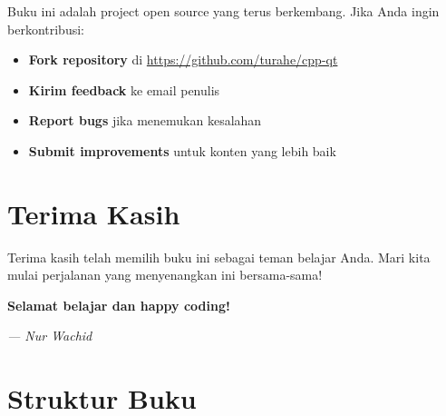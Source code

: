 Buku ini adalah project open source yang terus berkembang. Jika Anda ingin berkontribusi:

\begin{itemize}
\item \textbf{Fork repository} di \url{https://github.com/turahe/cpp-qt}
\item \textbf{Kirim feedback} ke email penulis
\item \textbf{Report bugs} jika menemukan kesalahan
\item \textbf{Submit improvements} untuk konten yang lebih baik
\end{itemize}

\section*{Terima Kasih}

Terima kasih telah memilih buku ini sebagai teman belajar Anda. Mari kita mulai perjalanan yang menyenangkan ini bersama-sama!

\begin{center}
\textbf{Selamat belajar dan happy coding! }

\vspace{1cm}
\textit{--- Nur Wachid}
\end{center}

\section*{Struktur Buku}

